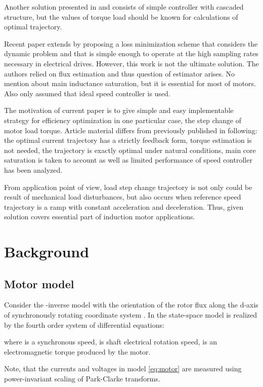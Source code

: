 \documentclass[journal]{IEEEtran}
\begin{document}
Another solution presented in \cite{7} and consists of simple controller with cascaded structure, but the values of torque load should be known for calculations of optimal trajectory.

Recent paper \cite{6} extends \cite{5} by proposing a loss minimization
scheme that considers the dynamic problem and that is simple
enough to operate at the high sampling rates necessary in electrical drives. However, this work is not the ultimate solution. The authors relied on flux estimation and thus question of estimator arises. No mention about main inductance saturation, but it is essential for most of motors. Also only assumed that ideal speed controller is used.


The motivation of current paper is to give simple and easy implementable strategy for efficiency optimization in one particular case, the step change of motor load torque. Article material differs from previously published in following: the optimal current trajectory has a strictly feedback form, torque estimation is not needed, the trajectory is exactly optimal under natural conditions, main core saturation is taken to account as well as limited performance of speed controller has been analyzed.

From application point of view, load step change trajectory is not only could be result of mechanical load disturbances, but also occurs when reference speed trajectory is a ramp with constant acceleration and deceleration. Thus, given solution covers essential part of induction motor applications.



\section{Background}

\subsection{Motor model}

Consider the -inverse model with the orientation of the rotor flux  along the d-axis of synchronously rotating coordinate system \cite{8}. In the state-space model is realized by the fourth order system of differential equations:



where  is a synchronous speed,  is shaft electrical rotation speed,  is an electromagnetic torque produced by the motor.

Note, that the currents and voltages in model \eqref{eq:motor} are measured using power-invariant scaling of Park-Clarke transforms.
\end{document}

